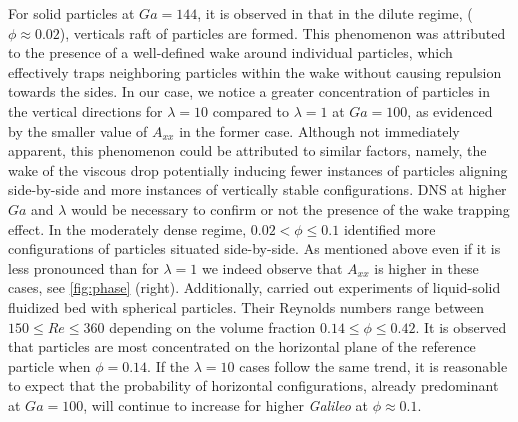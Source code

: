 For solid particles at $Ga = 144$, it is observed in \citet{shajahan2023inertial} that in the dilute regime, ($\phi \approx 0.02$), verticals raft of particles are formed. This phenomenon was attributed to the presence of a well-defined wake around individual particles, which effectively traps neighboring particles within the wake without causing repulsion towards the sides. %
In our case, we notice a greater concentration of particles in the vertical directions for $\lambda = 10$ compared to $\lambda = 1$ at $Ga = 100$, as evidenced by the smaller value of $A_{xx}$ in the former case. Although not immediately apparent, this phenomenon could be attributed to similar factors, namely, the wake of the viscous drop potentially inducing fewer instances of particles aligning side-by-side and more instances of vertically stable configurations. DNS at higher $Ga$ and $\lambda$ would be necessary to confirm or not the presence of the wake trapping effect. %
In the moderately dense regime,  $0.02 < \phi \le 0.1$  \citet{shajahan2023inertial} identified more configurations of particles situated side-by-side. 
As mentioned above even if it is less pronounced than for $\lambda = 1$ we indeed observe that $A_{xx}$ is higher in these cases, see \ref{fig:phase} (right). 
Additionally, \citet{almeras2021statistics} carried out experiments of liquid-solid fluidized bed with spherical particles. 
Their Reynolds numbers range between $150\leq Re \leq 360$ depending on the volume fraction $0.14 \leq \phi \leq 0.42$.
It is observed that particles are most concentrated on the horizontal plane of the reference particle when $\phi = 0.14$.
If the $\lambda = 10$ cases follow the same trend, it is reasonable to expect that the probability of horizontal configurations, already predominant at $Ga =100$, will continue to increase for higher \textit{Galileo} at $\phi  \approx 0.1$.


